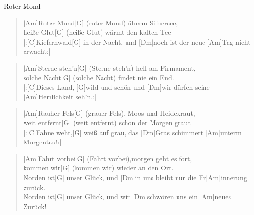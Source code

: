 \begin{song}{Roter Mond}{}

    \begin{verse}  
        [Am]Roter Mond[G] (roter Mond) überm Silbersee, \\
        [Am]heiße Glut[G] (heiße Glut) wärmt den kalten Tee \\
        |:[C]Kiefernwald[G] in der Nacht, und [Dm]noch ist der neue [Am]Tag nicht erwacht:|
    \end{verse}  

    \begin{verse}  
        [Am]Sterne steh'n[G] (Sterne steh'n) hell am Firmament, \\
        [Am]solche Nacht[G] (solche Nacht) findet nie ein End. \\
        |:[C]Dieses Land, [G]wild und schön und [Dm]wir dürfen seine [Am]Herrlichkeit seh'n.:|
    \end{verse}  

    \begin{verse}  
        [Am]Rauher Fels[G] (grauer Fels), Moos und Heidekraut, \\
        [Am]weit entfernt[G] (weit entfernt) schon der Morgen graut \\
        |:[C]Fahne weht,[G] weiß auf grau, das [Dm]Gras schimmert [Am]unterm Morgentau!:|
    \end{verse}  

    \begin{verse}  
        [Am]Fahrt vorbei[G] (Fahrt vorbei),morgen geht es fort, \\
        [Am]kommen wir[G] (kommen wir) wieder an den Ort. \\
        [C]Norden ist[G] unser Glück, und [Dm]in uns bleibt nur die Er[Am]innerung zurück. \\
        [C]Norden ist[G] unser Glück, und wir [Dm]schwören uns ein [Am]neues Zurück!
    \end{verse}  

\end{song}
